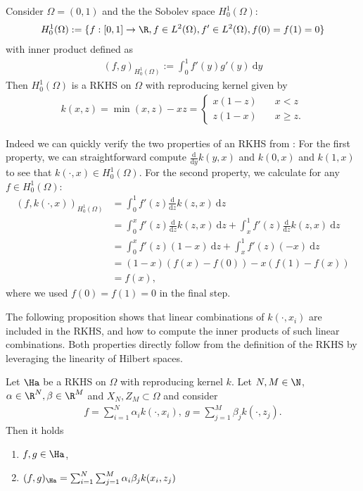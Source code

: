 \begin{example}
Consider $\Omega = (0, 1)$ and the the Sobolev space $H_0^1(\Omega)$:
\begin{align*}
H_0^1(\Omega) := \{ f: [0, 1] \rightarrow \R, f \in L^2(\Omega), f' \in L^2(\Omega), f(0) = f(1) = 0 \}
\end{align*}
with inner product defined as
\begin{align*}
(f, g)_{H_0^1(\Omega)} := \int_0^1 f'(y) g'(y) ~ \mathrm{d}y
\end{align*}
Then $H_0^1(\Omega)$ is a RKHS on $\Omega$ with reproducing kernel given by
\begin{align*}
k(x, z) = \min(x, z) - xz = 
\begin{cases}
x(1-z) & \quad x < z \\
z(1-x) & \quad x \geq z.
\end{cases}
\end{align*}

Indeed we can quickly verify the two properties of an RKHS from : 
For the first property, we can straightforward compute $\frac{\mathrm{d}}{\mathrm{d}y} k(y, x)$ and $k(0, x)$ and $k(1, x)$ to see that $k(\cdot, x) \in H_0^1(\Omega)$.
For the second property, we calculate for any $f \in H_0^1(\Omega)$:
\begin{align*}
(f, k(\cdot, x))_{H_0^1(\Omega)} &= \int_0^1 f'(z) \frac{\mathrm{d}}{\mathrm{d}z} k(z, x) ~ \mathrm{d}z \\
&= \int_0^x f'(z) \frac{\mathrm{d}}{\mathrm{d}z} k(z, x) ~ \mathrm{d}z + \int_x^1 f'(z) \frac{\mathrm{d}}{\mathrm{d}z} k(z, x) ~ \mathrm{d}z \\
&= \int_0^x f'(z) (1-x) ~ \mathrm{d}z + \int_x^1 f'(z) (-x) ~ \mathrm{d}z \\
&= (1-x) (f(x) - f(0)) - x (f(1) - f(x)) \\
&= f(x),
\end{align*}
where we used $f(0) = f(1) = 0$ in the final step.
\end{example}

The following proposition shows that linear combinations of $k(\cdot, x_i)$ are included in the RKHS, and how to compute the inner products of such linear combinations. 
Both properties directly follow from the definition of the RKHS by leveraging the linearity of Hilbert spaces.

\begin{prop}
Let $\Ha$ be a RKHS on $\Omega$ with reproducing kernel $k$. 
Let $N, M \in \N$, $\alpha \in \R^N, \beta \in \R^M$ and $X_N, Z_M \subset \Omega$ and consider
\begin{align*}
f = \sum_{i=1}^N \alpha_i k(\cdot, x_i), ~ g = \sum_{j=1}^M \beta_j k(\cdot, z_j).
\end{align*}
Then it holds
\begin{enumerate}
\item $f, g \in \Ha$,
\item $(f, g)_{\Ha} = \sum_{i=1}^N \sum_{j=1}^M \alpha_i \beta_j k(x_i, z_j)$ 
\end{enumerate}
\end{prop}

